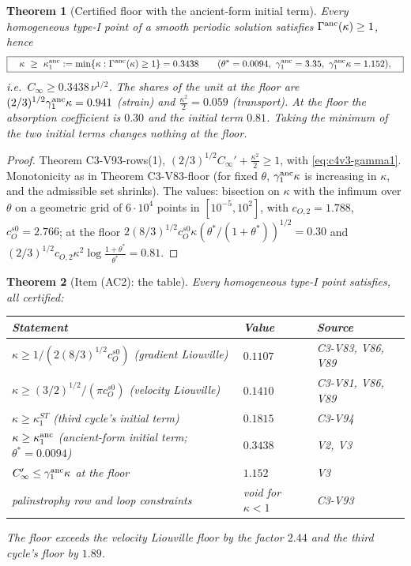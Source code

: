 \documentclass[11pt]{article}
\theoremstyle{plain}
\newtheorem{theorem}{Theorem}[section]
\theoremstyle{definition}
\theoremstyle{remark}
\begin{document}
\begin{theorem}[Certified floor with the ancient-form initial term]
\label{thm:c4v3-floor}
Every homogeneous type-I point of a smooth periodic solution
satisfies \(\Gamma^{\rm anc}(\kappa)\ge1\), hence
\begin{equation}
 \boxed{\quad
 \kappa\ \ge\ \kappa_1^{\rm anc}:=\min\{\kappa:\Gamma^{\rm anc}(\kappa)\ge1\}=0.3438
 \qquad(\theta^*=0.0094,\ \gamma_1^{\rm anc}=3.35,\ \gamma_1^{\rm anc}\kappa=1.152),
 \quad}
 \label{eq:c4v3-floor}
\end{equation}
i.e.\ \(C_\infty\ge0.3438\,\nu^{1/2}\).  The shares of the unit at the floor are
\((2/3)^{1/2}\gamma_1^{\rm anc}\kappa=0.941\) (strain) and \(\frac{\kappa^2}2=0.059\) (transport).  At the
floor the absorption coefficient is \(0.30\) and the initial term
\(0.81\).  Taking the minimum of the two initial terms changes nothing
at the floor.
\end{theorem}

\begin{proof}
Theorem C3-V93-rows(1), \((2/3)^{1/2}C_\infty'+\frac{\kappa^2}2\ge1\), with \eqref{eq:c4v3-gamma1}.
Monotonicity as in Theorem C3-V83-floor (for fixed \(\theta\), \(\gamma_1^{\rm anc}\kappa\) is
increasing in \(\kappa\), and the admissible set shrinks).  The values:
bisection on \(\kappa\) with the infimum over \(\theta\) on a geometric grid of
\(6\cdot10^4\) points in \([10^{-5},10^2]\), with \(c_{O,2}=1.788\), \(c_O^{s0}=2.766\); at the floor
\(2(8/3)^{1/2}c_O^{s0}\kappa(\theta^*/(1+\theta^*))^{1/2}=0.30\) and
\((2/3)^{1/2}c_{O,2}\kappa^2\log\frac{1+\theta^*}{\theta^*}=0.81\).
\end{proof}

\begin{theorem}[Item (AC2): the table]
\label{thm:c4v3-table}
Every homogeneous type-I point satisfies, all certified:

\medskip
\begin{center}\small
\begin{tabular}{@{}p{}p{}p{}@{}}
\toprule
\textbf{Statement} & \textbf{Value} & \textbf{Source}\\
\midrule
\(\kappa\ge1/(2(8/3)^{1/2}c_O^{s0})\) (gradient Liouville) & \(0.1107\) & C3-V83, V86, V89\\
\(\kappa\ge(3/2)^{1/2}/(\pi c_O^{s0})\) (velocity Liouville) & \(0.1410\) & C3-V81, V86, V89\\
\(\kappa\ge\kappa_1^{ST}\) (third cycle's initial term) & \(0.1815\) & C3-V94\\
\(\kappa\ge\kappa_1^{\rm anc}\) (ancient-form initial term; \(\theta^*=0.0094\)) & \(\mathbf{0.3438}\) & V2, V3\\
\(C_\infty'\le\gamma_1^{\rm anc}\kappa\) at the floor & \(1.152\) & V3\\
palinstrophy row and loop constraints & void for \(\kappa<1\) & C3-V93\\
\bottomrule
\end{tabular}
\end{center}
\medskip

\noindent
The floor exceeds the velocity Liouville floor by the factor \(2.44\)
and the third cycle's floor by \(1.89\).
\end{theorem}
\end{document}
